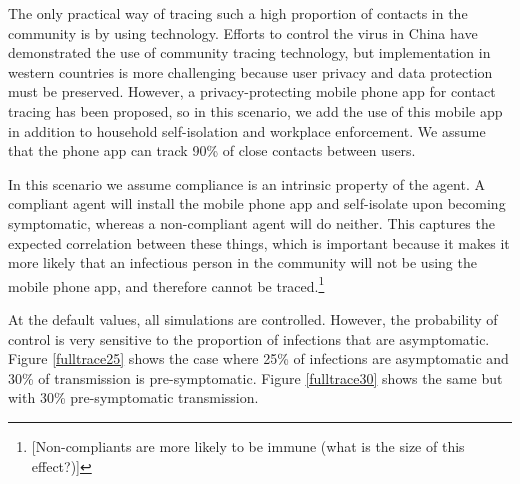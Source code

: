 \documentclass{article}
\begin{document}
The only practical way of tracing such a high proportion of contacts in the community is by using technology. Efforts to control the virus in China have demonstrated the use of community tracing technology, but implementation in western countries is more challenging because user privacy and data protection must be preserved. However, a privacy-protecting mobile phone app for contact tracing has been proposed\cite{tang2020Mobile}, so in this scenario, we add the use of this mobile app in addition to household self-isolation and workplace enforcement. We assume that the phone app can track 90\% of close contacts between users.

In this scenario we assume compliance is an intrinsic property of the agent. A compliant agent will install the mobile phone app and self-isolate upon becoming symptomatic, whereas a non-compliant agent will do neither. This captures the expected correlation between these things, which is important because it makes it more likely that an infectious person in the community will not be using the mobile phone app, and therefore cannot be traced.\footnote{[Non-compliants are more likely to be immune (what is the size of this effect?)]}

At the default values, all simulations are controlled. However, the probability of control is very sensitive to the proportion of infections that are asymptomatic. Figure \ref{fulltrace25} shows the case where 25\% of infections are asymptomatic and 30\% of transmission is pre-symptomatic. Figure \ref{fulltrace30} shows the same but with 30\% pre-symptomatic transmission.
\end{document}
